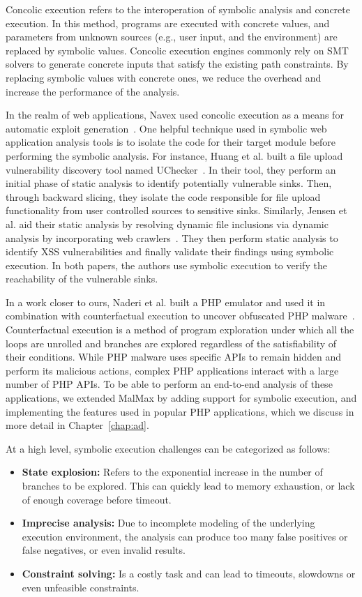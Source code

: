 Concolic execution refers to the interoperation of symbolic analysis and concrete execution. 
In this method, programs are executed with concrete values, and parameters from unknown sources (e.g., user input, and the environment) are replaced by symbolic values. 
Concolic execution engines commonly rely on SMT solvers to generate concrete inputs that satisfy the existing path constraints. 
By replacing symbolic values with concrete ones, we reduce the overhead and increase the performance of the analysis. 

In the realm of web applications, Navex used concolic execution as a means for automatic exploit generation~\cite{alhuzali2018navex}. 
One helpful technique used in symbolic web application analysis tools is to isolate the code for their target module before performing the symbolic analysis. 
For instance, Huang et al. built a file upload vulnerability discovery tool named UChecker~\cite{Huang2019}. 
In their tool, they perform an initial phase of static analysis to identify potentially vulnerable sinks. 
Then, through backward slicing, they isolate the code responsible for file upload functionality from user controlled sources to sensitive sinks. 
Similarly, Jensen et al. aid their static analysis by resolving dynamic file inclusions via dynamic analysis by incorporating web crawlers~\cite{jensen2012thaps}. 
They then perform static analysis to identify XSS vulnerabilities and finally validate their findings using symbolic execution. 
In both papers, the authors use symbolic execution to verify the reachability of the vulnerable sinks. 

In a work closer to ours, Naderi et al. built a PHP emulator and used it in combination with counterfactual execution to uncover obfuscated PHP malware~\cite{naderi2019cubismo,naderi2019malmax}. 
Counterfactual execution is a method of program exploration under which all the loops are unrolled and branches are explored regardless of the satisfiability of their conditions. 
While PHP malware uses specific APIs to remain hidden and perform its malicious actions, complex PHP applications interact with a large number of PHP APIs. 
To be able to perform an end-to-end analysis of these applications, we extended MalMax by adding support for symbolic execution, and implementing the features used in popular PHP applications, which we discuss in more detail in Chapter~\ref{chap:ad}. 

At a high level, symbolic execution challenges can be categorized as follows:
\begin{itemize}
    \item \textbf{State explosion:} Refers to the exponential increase in the number of branches to be explored. This can quickly lead to memory exhaustion, or lack of enough coverage before timeout.
    \item \textbf{Imprecise analysis:} Due to incomplete modeling of the underlying execution environment, the analysis can produce too many false positives or false negatives, or even invalid results. 
    \item \textbf{Constraint solving:} Is a costly task and can lead to timeouts, slowdowns or even unfeasible constraints.
\end{itemize}


